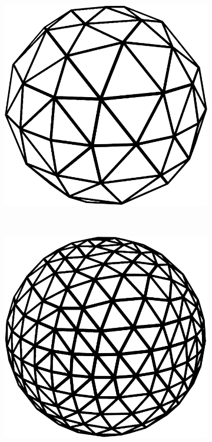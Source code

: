 \begin{figure}
\begin{subfigure}[b]{0.2\textwidth}
    \end{subfigure}
    ~ %
    \begin{subfigure}[b]{0.2\textwidth}
        \includegraphics[width=\textwidth]{figures/tessellation/tessellation_htm3.png}
    \end{subfigure}
    ~ %
    \begin{subfigure}[b]{0.2\textwidth}
        \includegraphics[width=\textwidth]{figures/tessellation/tessellation_htm4.png}

\end{subfigure}
\end{figure}

